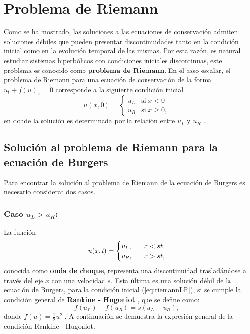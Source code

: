 \section{Problema de Riemann}
Como se ha mostrado, las soluciones a las ecuaciones de conservación admiten soluciones débiles que pueden presentar discontinuidades tanto en la condición inicial como en la evolución temporal de las mismas. Por esta razón, es natural estudiar sistemas hiperbólicos con condiciones iniciales discontinuas, este problema es conocido como \textbf{problema de Riemann}. En el caso escalar, el problema de Riemann para una ecuación de conservación de la forma $u_t + f(u)_x = 0$ corresponde a la siguiente condición inicial
\begin{equation}
	u(x,0) = 
	\begin{cases}
		u_L & \text{si } x < 0 \\
		u_R & \text{si } x \geq 0,
		\label{eq:riemannLR}
	\end{cases}
\end{equation}
en donde la solución es determinada por la relación entre $u_L$ y $u_R$ \cite{Leveque}.
\subsection{Solución al problema de Riemann para la ecuación de Burgers}
Para encontrar la solución al problema de Riemann de la ecuación de Burgers es necesario considerar dos casos.
\subsubsection{Caso $u_L > u_R$:}
La función
\begin{equation}
	u(x,t) = 
	\begin{cases}
		u_L, & \hspace{3mm} x < st \\
		u_R, & \hspace{3mm} x > st,		
	\end{cases}\label{eq:solriemannLR}
\end{equation}
conocida como \textbf{onda de choque}, representa una discontinuidad trasladándose a través del eje $x$ con una velocidad $s$. Esta última es una solución débil de la ecuación de Burgers, para la condición inicial (\ref{eq:riemannLR}), si se cumple la condición general de  \textbf{Rankine - Hugoniot} \cite{Cameron}, que se define como:
\begin{equation}
	f(u_L) - f(u_R) = s(u_L - u_R),
	\label{eq:rankinehugo}
\end{equation}
donde $f(u) = \frac{1}{2} u^{2}$ \cite{Leveque}. A continuación se demuestra la expresión general de la condición Rankine - Hugoniot.\\

